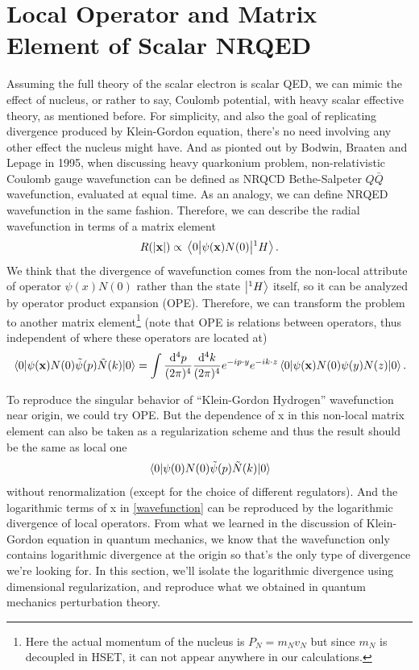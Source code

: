 \documentclass[aps,prd,preprint,showkeys,notitlepage,10pt]{revtex4-1}
\begin{document}
\section{Local Operator and Matrix Element of Scalar NRQED\label{sec:lo}}
Assuming the full theory of the scalar electron is scalar QED, we can mimic the effect of nucleus, or rather to say, Coulomb potential, with heavy scalar effective theory, as mentioned before. For simplicity, and also the goal of replicating divergence produced by Klein-Gordon equation, there's no need involving any other effect the nucleus might have. And as pionted out by Bodwin, Braaten and Lepage in 1995\cite{Bodwin1995}, when discussing heavy quarkonium problem, non-relativistic Coulomb gauge wavefunction can be defined as NRQCD Bethe-Salpeter $Q\bar Q$ wavefunction, evaluated at equal time. As an analogy, we can define NRQED wavefunction in the same fashion. Therefore, we can describe the radial wavefunction in terms of a matrix element
\begin{align}
	R(\abs{\vb{x}})\propto\mel{0}{\psi(\vb{x})N(0)}{{}^1H}.\label{wavefunction}
\end{align}
We think that the divergence of wavefunction comes from the non-local attribute of operator $\psi(x)N(0)$ rather than the state $\ket{{}^1H}$ itself, so it can be analyzed by operator product expansion (OPE)\cite{Lepage:1997cs}. Therefore, we can transform the problem to another matrix element\footnote{Here the actual momentum of the nucleus is $P_N=m_Nv_N$ but since $m_N$ is decoupled in HSET, it can not appear anywhere in our calculations. } (note that OPE is relations between operators, thus independent of where these operators are located at)
\begin{align}
	\mel{0}{\psi(\vb{x})N(0)\tilde\psi(p)\tilde N(k)}{0}=\int\frac{\dd^4 p}{(2\pi)^4}\frac{\dd^4 k}{(2\pi)^4}e^{-ip\cdot y}e^{-ik\cdot z}\mel{0}{\psi(\vb{x})N(0)\psi(y)N(z)}{0}.\label{NLME}
\end{align}

To reproduce the singular behavior of ``Klein-Gordon Hydrogen'' wavefunction near origin, we could try OPE. But the dependence of x in this non-local matrix element can also be taken as a regularization scheme and thus the result should be the same as local one
$$\mel{0}{\psi(0)N(0)\tilde\psi(p)\tilde N(k)}{0}$$
without renormalization (except for the choice of different regulators). And the logarithmic terms of x in \eqref{wavefunction} can be reproduced by the logarithmic divergence of local operators. From what we learned in the discussion of Klein-Gordon equation in quantum mechanics, we know that the wavefunction only contains logarithmic divergence at the origin so that's the only type of divergence we're looking for. In this section, we'll isolate the logarithmic divergence using dimensional regularization, and reproduce what we obtained in quantum mechanics perturbation theory.
\end{document}
